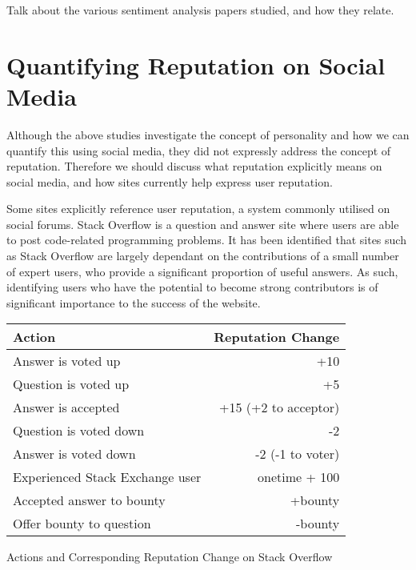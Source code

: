 

Talk about the various sentiment analysis papers studied, and how they relate.

\section{Quantifying Reputation on Social Media}

Although the above studies investigate the concept of personality and how we can quantify this using social media, they did not expressly address the concept of reputation. Therefore we should discuss what reputation explicitly means on social media, and how sites currently help express user reputation. 

Some sites explicitly reference user reputation, a system commonly utilised on social forums. Stack Overflow is a question and answer site where users are able to post code-related programming problems. It has been identified that sites such as Stack Overflow are largely dependant on the contributions of a small number of expert users, who provide a significant proportion of useful answers. As such, identifying users who have the potential to become strong contributors is of significant importance to the success of the website.\\
\begin{center}
\begin{tabular}{l|r}
 Action & Reputation Change\\ \hline
 Answer is voted up & +10 \\
 Question is voted up & +5 \\
 Answer is accepted & +15 (+2 to acceptor) \\
 Question is voted down & -2 \\
 Answer is voted down & -2 (-1 to voter) \\
 Experienced Stack Exchange user & onetime + 100 \\
 Accepted answer to bounty & +bounty \\
 Offer bounty to question & -bounty \\ 
\end{tabular}
\end{center}
Actions and Corresponding Reputation Change on Stack Overflow \cite{movshovitzanalysis}\\

